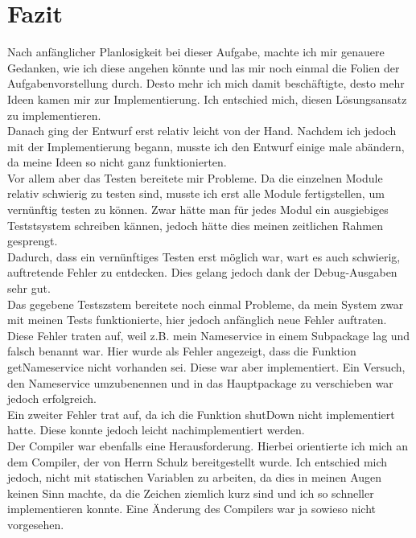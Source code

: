 %
\chapter{Fazit}
Nach anfänglicher Planlosigkeit bei dieser Aufgabe, machte ich mir genauere Gedanken, wie ich diese angehen könnte und las mir noch einmal die Folien der Aufgabenvorstellung durch. Desto mehr ich mich damit beschäftigte, desto mehr Ideen kamen mir zur Implementierung. Ich entschied mich, diesen Lösungsansatz zu implementieren. \\
Danach ging der Entwurf erst relativ leicht von der Hand. Nachdem ich jedoch mit der Implementierung begann, musste ich den Entwurf einige male abändern, da meine Ideen so nicht ganz funktionierten.\\
Vor allem aber das Testen bereitete mir Probleme. Da die einzelnen Module relativ schwierig zu testen sind, musste ich erst alle Module fertigstellen, um vernünftig testen zu können. Zwar hätte man für jedes Modul  ein ausgiebiges Teststsystem schreiben kännen, jedoch hätte dies meinen zeitlichen Rahmen gesprengt. \\
Dadurch, dass ein vernünftiges Testen erst möglich war, wart es auch schwierig, auftretende Fehler zu entdecken. Dies gelang jedoch dank der Debug-Ausgaben sehr gut. \\ 
Das gegebene Testszstem bereitete noch einmal Probleme, da mein System zwar mit meinen Tests funktionierte, hier jedoch anfänglich neue Fehler auftraten. Diese Fehler traten auf, weil z.B. mein Nameservice in einem Subpackage lag und falsch benannt war. Hier wurde als Fehler angezeigt, dass  die Funktion getNameservice nicht vorhanden sei. Diese war aber implementiert. Ein Versuch, den Nameservice umzubenennen und in das Hauptpackage zu verschieben war jedoch erfolgreich.\\
Ein zweiter Fehler trat auf, da ich die Funktion shutDown nicht implementiert hatte. Diese konnte jedoch leicht nachimplementiert werden.\\
Der Compiler war ebenfalls eine Herausforderung. Hierbei orientierte ich mich an dem Compiler, der von Herrn Schulz bereitgestellt wurde. Ich entschied mich jedoch, nicht mit statischen Variablen zu arbeiten, da dies in meinen Augen keinen Sinn machte, da die Zeichen ziemlich kurz sind und ich so schneller implementieren konnte. Eine Änderung des Compilers war ja sowieso nicht vorgesehen.